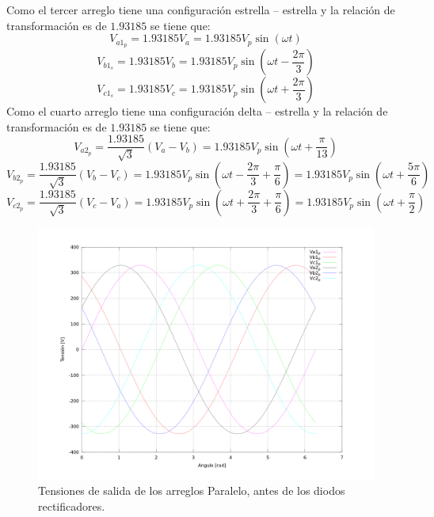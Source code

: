 \documentclass[12pt,graphicx,caption,rotating]{article}
\begin{document}
\noindent
Como el tercer arreglo tiene una configuración estrella – estrella y la relación de transformación es de $1.93185$ se tiene que:
\begin{equation}
 V_{a1_{p}} = 1.93185 V_a = 1.93185  V_p \sin \left (\omega t \right)
 \label{ecu10}
\end{equation}
\begin{equation}
 V_{b1_{s}} = 1.93185  V_b = 1.93185  V_p \sin \left (\omega t - \frac{2 \pi}{3}\right)
 \label{ecu11}
\end{equation}
\begin{equation}
 V_{c1_{s}} = 1.93185  V_c = 1.93185  V_p \sin \left (\omega t+ \frac{2 \pi}{3}\right )
 \label{ecu12}
\end{equation}
\noindent
Como el cuarto arreglo tiene una configuración delta – estrella y la relación de transformación es de $1.93185$ se tiene que:
\begin{equation}
 {V_{a{2_p}}} = \frac{1.93185}{{\sqrt 3 }}\left( {{V_a} - {V_b}} \right) = 1.93185 {V_p}\sin \left( {\omega t + \frac{\pi }{13}} \right)
 \label{ecu13}
\end{equation}
\begin{equation}
 {V_{b{2_p}}} = \frac{1.93185}{{\sqrt 3 }}\left( {{V_b} - {V_c}} \right) = 1.93185 {V_p}\sin \left( {\omega t - \frac{{2\pi }}{3} + \frac{\pi }{6}} \right) = 1.93185 {V_p}\sin \left( {\omega t + \frac{{5\pi }}{6}} \right)
 \label{ecu14}
\end{equation}
\begin{equation}
 {V_{c{2_p}}} = \frac{1.93185}{{\sqrt 3 }}\left( {{V_c} - {V_a}} \right) = 1.93185 {V_p}\sin \left( {\omega t + \frac{{2\pi }}{3} + \frac{\pi }{6}} \right) = 1.93185 {V_p}\sin \left( {\omega t + \frac{\pi }{2}} \right)
 \label{ecu15}
\end{equation}
\begin{figure}[H]
	\centering
		\includegraphics[scale=0.4]{tensiones_in_2.png}
	\caption{Tensiones de salida de los arreglos Paralelo, antes de los diodos rectificadores.}
	\label{fig2}
\end{figure}
\end{document}
